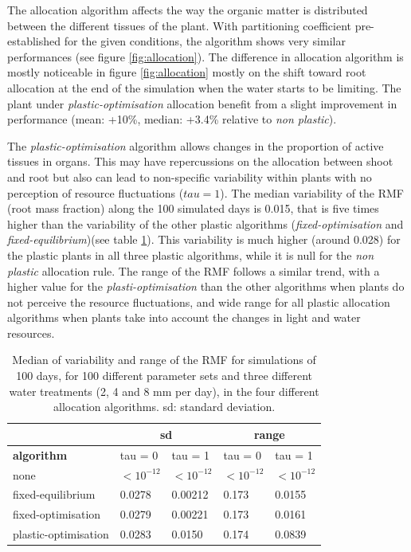 The allocation algorithm affects the way the organic matter is distributed between the different tissues of the plant. With partitioning coefficient pre-established for the given conditions, the algorithm shows very similar performances (see figure \ref{fig:allocation}). The difference in allocation algorithm is mostly noticeable in figure \ref{fig:allocation} mostly on the shift toward root allocation at the end of the simulation when the water starts to be limiting. The plant under \textit{plastic-optimisation} allocation benefit from a slight improvement in performance (mean: +10\%, median: +3.4\% relative to \textit{non plastic}).

The \textit{plastic-optimisation} algorithm allows changes in the proportion of active tissues in organs. This may have repercussions on the allocation between shoot and root but also can lead to non-specific variability within plants with no perception of resource fluctuations ($tau = 1$). The median variability of the RMF (root mass fraction) along the 100 simulated days is 0.015, that is five times higher than the variability of the other plastic algorithms (\textit{fixed-optimisation} and \textit{fixed-equilibrium})(see table \ref{table:variability-rmf}). This variability is much higher (around 0.028) for the plastic plants in all three plastic algorithms, while it is null for the \textit{non plastic} allocation rule. The range of the RMF follows a similar trend, with a higher value for the \textit{plasti-optimisation} than the other algorithms when plants do not perceive the resource fluctuations, and wide range for all plastic allocation algorithms when plants take into account the changes in light and water resources.

\begin{table}[h]
\centering
\caption{Median of variability and range of the RMF for simulations of 100 days, for 100 different parameter sets and three different water treatments (2, 4 and 8 mm per day), in the four different allocation algorithms. sd: standard deviation.}
\label{table:variability-rmf}
\begin{tabular}{l|ll|ll}
            & \multicolumn{2}{c}{\textbf{sd}}              & \multicolumn{2}{c}{\textbf{range}}           \\
\hline
\textbf{algorithm}                     & tau = 0          & tau = 1          & tau = 0          & tau = 1          \\
\hline
none                 & $<10^{-12}$ & $<10^{-12}$ & $<10^{-12}$ & $<10^{-12}$ \\
fixed-equilibrium    & 0.0278           & 0.00212          & 0.173            & 0.0155           \\
fixed-optimisation   & 0.0279           & 0.00221          & 0.173            & 0.0161           \\
plastic-optimisation & 0.0283           & 0.0150           & 0.174            & 0.0839          
\end{tabular}
\end{table}

